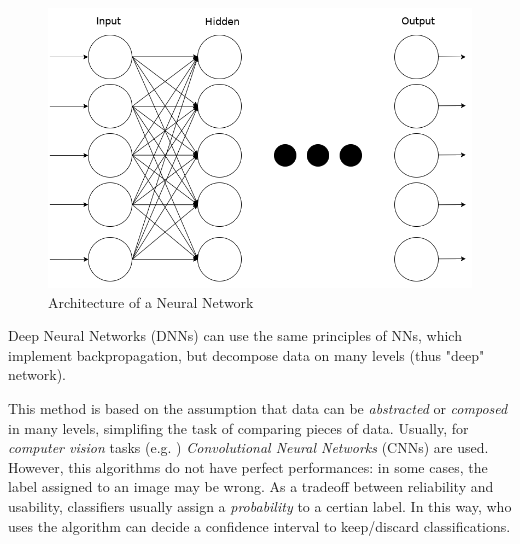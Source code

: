 \begin{figure}[htpb]
\centering
    \includegraphics[scale=0.28]{../img/nn}
    \caption{Architecture of a Neural Network}
    \label{fig:nn}
\end{figure}

Deep Neural Networks (DNNs) can use the same principles of NNs, which implement backpropagation, but decompose data on many levels (thus "deep" network).

This method is based on the assumption that data can be \textit{abstracted} or \textit{composed} in many levels, simplifing the task of comparing pieces of data.
Usually, for \textit{computer vision} tasks (e.g. \cite{Handwritten}) \textit{Convolutional Neural Networks} (CNNs) are used\cite{CNN}.
However, this algorithms do not have perfect performances: in some cases, the label assigned to an image may be wrong. As a tradeoff between reliability and usability, classifiers usually assign a \textit{probability} to a certian label. In this way, who uses the algorithm can decide a confidence interval to keep/discard classifications. 